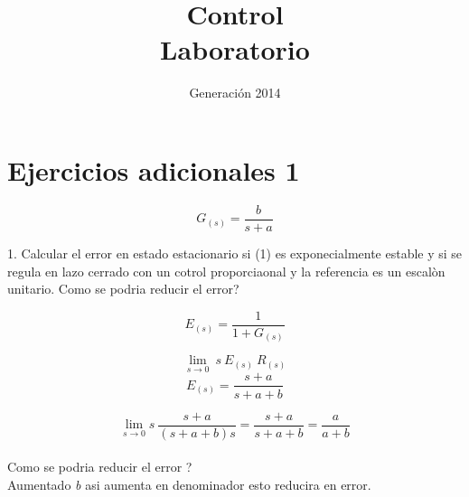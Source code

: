 \documentclass{tufte-handout}
\title{Control\\Laboratorio}
\author{Generación 2014}
\begin{document}
 \maketitle

\section{Ejercicios adicionales 1}
		\begin{equation}
	G_{(s)} = \frac{b}{s+a}
	\end{equation}

1. Calcular el error en estado estacionario si (1) es exponecialmente estable y si se regula en lazo cerrado con un cotrol proporciaonal y la referencia es un escal\`on unitario. Como se podria reducir el error? 

		\begin{equation} 
		E_{(s)} = \frac{1}{ 1 + G_{(s)}} \nonumber  
		\end{equation}	
		
		\begin{equation}
		\lim_{s \rightarrow 0 } \ s \ E_{(s)} \ R_{(s)}	\nonumber
 \end{equation}
		\begin{equation}
		E_{(s)} = \frac{s+a}{s+a+b} \nonumber
			\end{equation}

	
			\begin{equation}
			\lim_{s\rightarrow 0} s \ \frac{s+a}{(s+a+b)s} = \frac{s+a}{s+a+b} = \frac{a}{a+b} \nonumber
\end{equation}
\\
Como se podria reducir el error ? \\ Aumentado \emph{b} asi aumenta en denominador  esto reducira en error.
\\
\end{document}
